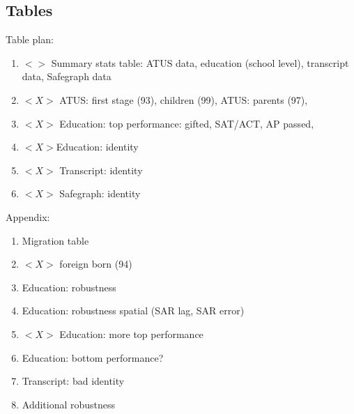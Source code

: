 \documentclass[11pt]{article}
\begin{document}
\clearpage
\subsection{Tables}

Table plan:
\begin{enumerate}
\item $<>$ Summary stats table: ATUS data, education (school level), transcript data, Safegraph data
\item $<X>$ ATUS: first stage (93), children (99), ATUS: parents (97),
\item $<X>$ Education: top performance: gifted, SAT/ACT, AP passed, 
\item $<X> $Education: identity
\item $<X>$ Transcript: identity
\item $<X>$ Safegraph: identity
\end{enumerate}

Appendix:
\begin{enumerate}
\item Migration table
\item $<X>$ foreign born (94)
\item Education: robustness
\item Education: robustness spatial (SAR lag, SAR error)
\item $<X>$ Education: more top performance
\item Education: bottom performance?
\item Transcript: bad identity
\item Additional robustness
\end{enumerate}






\clearpage

\singlespacing

\setcounter{footnote}{0}

\setcounter{section}{0}

\setcounter{page}{1}
\renewcommand\thepage{A.\arabic{page}}

\renewcommand*{\theHsection}{\arabic{section}.\arabic{section}} 
\end{document}
